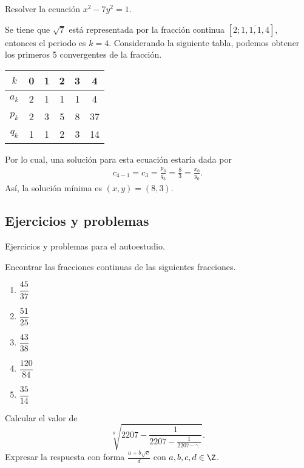 \begin{example}
    Resolver la ecuación $x^2 - 7y^2 = 1$.
\end{example}
\begin{solution}
    Se tiene que $\sqrt {7}$ está representada por la fracción continua $[2;\overline{1,1,1,4}]$, entonces el periodo es $k = 4$.
    Considerando la siguiente tabla, podemos obtener los primeros 5 convergentes de la fracción.
    \begin{table}[H]
        \centering
        \begin{tabular}{c||c|c|c|c|c}
            $k$ & 0 & 1 & 2 & 3 & 4 \\\hline\hline
            $a_k$ & 2 & 1 & 1 & 1 & 4\\
            $p_k$ & 2 & 3 & 5 & 8 & 37\\
            $q_k$ & 1 & 1 & 2 & 3 & 14\\
        \end{tabular}
    \end{table}
    Por lo cual, una solución para esta ecuación estaría dada por
    \begin{align*}
        c_{4 - 1} = c_3 = \frac{p_3}{q_3} = \frac{8}{3} = \frac{x_0}{y_0}.
    \end{align*}
    Así, la solución mínima es $(x,y) = (8,3)$.
\end{solution}


\subsection{Ejercicios y problemas}

Ejercicios y problemas para el autoestudio.

\begin{exercise}
    Encontrar las fracciones continuas de las siguientes fracciones.
    \begin{multicols}{3}
        \begin{enumerate}
            \item $\dfrac{45}{37}$
            \item $\dfrac{51}{25}$
            \item $\dfrac{43}{38}$
            \item $\dfrac{120}{84}$
            \item $\dfrac{35}{14}$
        \end{enumerate}
    \end{multicols}
\end{exercise}

\begin{problem}
    Calcular el valor de
    \[
        \sqrt[8]{2207 - \frac{1}{2207 - \frac{1}{2207 - \ddots}}}.
    \]
    Expresar la respuesta con forma $\frac{a + b\sqrt{c}}{d}$ con $a,b,c,d \in \Z$.
\end{problem}